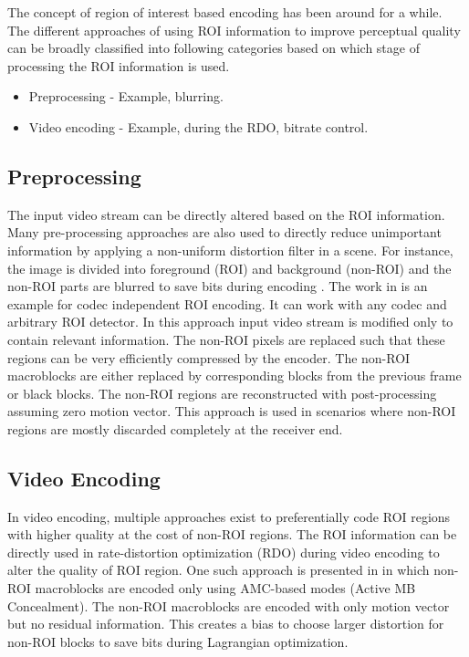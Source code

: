 \documentclass[11pt]{article} %
\begin{document}
The concept of region of interest based encoding has been around for a while. The different approaches of using ROI information to improve perceptual quality can be broadly classified into following categories based on which stage of processing the ROI information is used.
\begin{itemize}  
\item Preprocessing - Example, blurring.
\item Video encoding - Example, during the RDO, bitrate control.
\end{itemize}

\subsection{Preprocessing}
The input video stream can be directly altered based on the ROI information. Many pre-processing approaches are also used to directly reduce unimportant information by applying a non-uniform distortion filter in a scene. For instance, the image is divided into foreground (ROI) and background (non-ROI) and the non-ROI parts are blurred to save bits during encoding \cite{ROI-background-blurring}. The work in \cite{pre-postprocessig-ROI-codec-independent} is an example for codec independent ROI encoding. It can work with any codec and arbitrary ROI detector. In this approach input video stream is modified only to contain relevant information. The non-ROI pixels are replaced such that these regions can be very efficiently compressed by the encoder. The non-ROI macroblocks are either replaced by corresponding blocks from the previous frame or black blocks. The non-ROI regions are reconstructed with post-processing assuming zero motion vector. This approach is used in scenarios where non-ROI regions are mostly discarded completely at the receiver end.

\subsection{Video Encoding}
In video encoding, multiple approaches exist to preferentially code ROI regions with higher quality at the cost of non-ROI regions. The ROI information can be directly used in rate-distortion optimization (RDO) during video encoding to alter the quality of ROI region. One such approach is presented in \cite{ROI-rate-control-H264} in which non-ROI macroblocks are encoded only using AMC-based modes (Active MB Concealment). The non-ROI macroblocks are encoded with only motion vector but no residual information. This creates a bias to choose larger distortion for non-ROI blocks to save bits during Lagrangian optimization.
\end{document}
